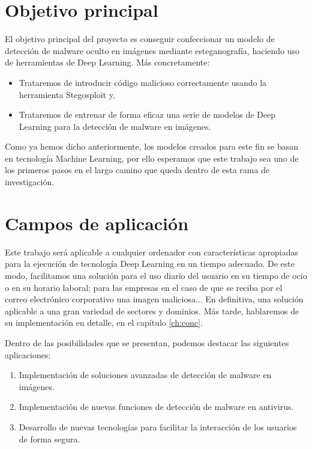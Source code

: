 \section{Objetivo principal}

El objetivo principal del proyecto es conseguir confeccionar un modelo de detección de malware oculto en imágenes mediante esteganografía, haciendo uso de herramientas de Deep Learning. Más concretamente:

\begin{itemize}
\item Trataremos de introducir código malicioso correctamente usando la herramienta Stegosploit y,
\item Trataremos de entrenar de forma eficaz una serie de modelos de Deep Learning para la detección de malware en imágenes.
\end{itemize}

Como ya hemos dicho anteriormente, los modelos creados para este fin se basan en tecnología Machine Learning, por ello esperamos que este trabajo sea uno de los primeros pasos en el largo camino que queda dentro de esta rama de investigación.

\section{Campos de aplicación}

Este trabajo será aplicable a cualquier ordenador con características apropiadas para la ejecución de tecnología Deep Learning en un tiempo adecuado. De este modo, facilitamos una solución para el uso diario del usuario en su tiempo de ocio o en su horario laboral; para las empresas en el caso de que se reciba por el correo electrónico corporativo una imagen maliciosa... En definitiva, una solución aplicable a una gran variedad de sectores y dominios. Más tarde, hablaremos de su implementación en detalle, en el capítulo \ref{ch:conc}.

Dentro de las posibilidades que se presentan, podemos destacar las siguientes aplicaciones:
\begin{enumerate}
\item Implementación de soluciones avanzadas de detección de malware en imágenes.
\item Implementación de nuevas funciones de detección de malware en antivirus.
\item Desarrollo de nuevas tecnologías para facilitar la interacción de los usuarios de forma segura.
\end{enumerate}


